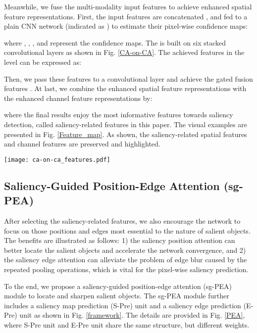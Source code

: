 \documentclass[runningheads]{llncs}
\begin{document}
Meanwhile, we fuse the multi-modality input features to achieve enhanced spatial feature representations.
First, the input features are concatenated , and fed to a plain CNN network (indicated as ) to estimate their pixel-wise confidence maps:

where , , , and    represent the confidence maps. The  is built on six stacked convolutional layers as shown in Fig. \ref{CA-on-CA}. The achieved features in the level  can be expressed as:

Then, we pass these features to a convolutional layer and achieve the gated fusion features . At last, we combine the enhanced spatial feature representations with the enhanced channel feature representations by:

where the final results  enjoy the most informative features towards saliency detection, called saliency-related features in this paper. The visual examples are presented in Fig. \ref{Feature_map}. As shown, the saliency-related spatial features and channel features are preserved and highlighted.

\begin{figure*}[!t]
	\centering
	\texttt{[image: ca-on-ca\_features.pdf]}
	\caption{\textbf{Visual results of the intermediate features in our AFS module}. `CA-on-CA Features' indicates the features after our channel selection while `Gated Fusion Features' represents the features after our spatial selection.}
	\label{Feature_map}
\end{figure*}


\subsection{Saliency-Guided Position-Edge Attention (sg-PEA)}
After selecting the saliency-related features, we also encourage the network to focus on those positions and edges most essential to the nature of salient objects. The benefits are illustrated as follows:
1) the saliency position attention can better locate the salient objects and accelerate the network convergence, and 2) the saliency edge attention can alleviate the problem of edge blur caused by the repeated pooling operations, which is vital for the pixel-wise saliency prediction.

To the end, we propose a saliency-guided position-edge attention (sg-PEA) module to  locate and sharpen salient objects. The sg-PEA module further includes a saliency map prediction  (S-Pre) unit and a saliency edge prediction (E-Pre) unit as shown in Fig. \ref{framework}. The details are provided in Fig. \ref{PEA}, where  S-Pre unit and E-Pre unit share the same structure, but different weights.
\end{document}
